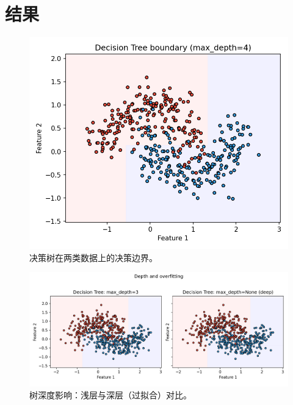 \documentclass[UTF8,zihao=-4]{ctexart}
\begin{document}


\section{结果}
\begin{figure}[H]
  \centering
  \includegraphics[width=0.9\linewidth]{dt_decision_boundary_2class.png}
  \caption{决策树在两类数据上的决策边界。}
  \label{fig:dt2_cn}
\end{figure}
\FloatBarrier

\begin{figure}[H]
  \centering
  \includegraphics[width=0.95\linewidth]{dt_depth_compare.png}
  \caption{树深度影响：浅层与深层（过拟合）对比。}
  \label{fig:depth_cn}
\end{figure}
\FloatBarrier
\end{document}
